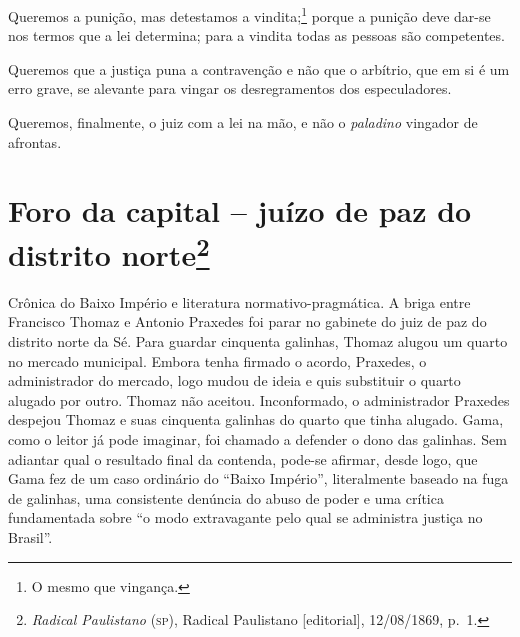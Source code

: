 Queremos a punição, mas detestamos a vindita;\footnote{O mesmo que
  vingança.} porque a punição deve dar-se nos termos que a lei
determina; para a vindita todas as pessoas são competentes.

Queremos que a justiça puna a contravenção e não que o arbítrio, que em
si é um erro grave, se alevante para vingar os desregramentos dos
especuladores.

Queremos, finalmente, o juiz com a lei na mão, e não o \emph{paladino}
vingador de afrontas.

\chapter{Foro da capital -- juízo de paz do distrito norte\footnote{\emph{Radical Paulistano} (\textsc{sp}), Radical Paulistano {[}editorial{]},
  12/08/1869, p.~1.}}

\begin{didascalia}
Crônica do Baixo Império e literatura normativo-pragmática. A briga
entre Francisco Thomaz e Antonio Praxedes foi parar no gabinete do juiz
de paz do distrito norte da Sé. Para guardar cinquenta galinhas, Thomaz
alugou um quarto no mercado municipal. Embora tenha firmado o acordo,
Praxedes, o administrador do mercado, logo mudou de ideia e quis
substituir o quarto alugado por outro. Thomaz não aceitou. Inconformado,
o administrador Praxedes despejou Thomaz e suas cinquenta galinhas do
quarto que tinha alugado. Gama, como o leitor já pode imaginar, foi
chamado a defender o dono das galinhas. Sem adiantar qual o resultado
final da contenda, pode-se afirmar, desde logo, que Gama fez de um caso
ordinário do ``Baixo Império'', literalmente baseado na fuga de galinhas,
uma consistente denúncia do abuso de poder e uma crítica fundamentada
sobre ``o modo extravagante pelo qual se administra justiça no Brasil''.
\end{didascalia}


